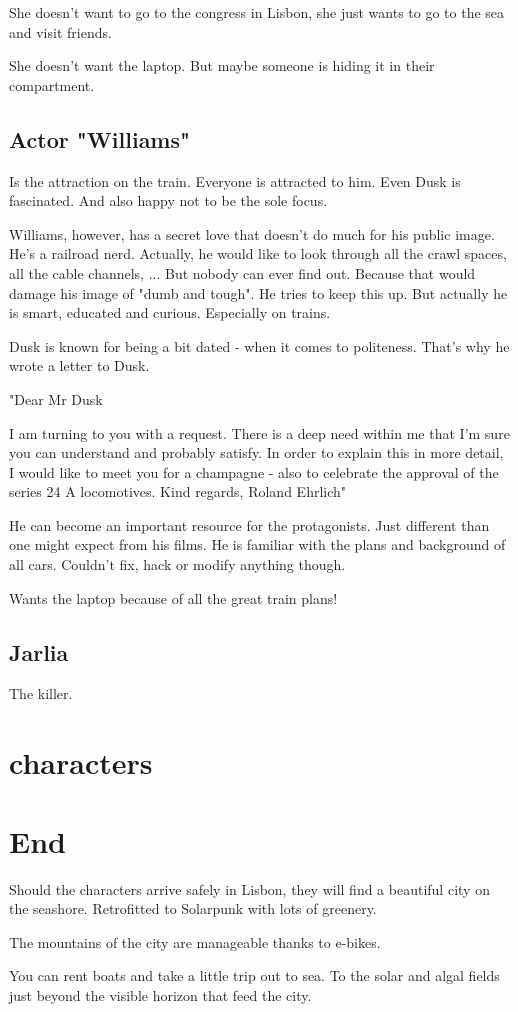 \documentclass{book}
\begin{document}
She doesn't want to go to the congress in Lisbon, she just wants to go to the sea and visit friends.

She doesn't want the laptop. But maybe someone is hiding it in their compartment.

\subsection{Actor "Williams"}


Is the attraction on the train. Everyone is attracted to him. Even Dusk is fascinated. And also happy not to be the sole focus.

Williams, however, has a secret love that doesn't do much for his public image. He's a railroad nerd. Actually, he would like to look through all the crawl spaces, all the cable channels, ...
But nobody can ever find out. Because that would damage his image of "dumb and tough". He tries to keep this up. But actually he is smart, educated and curious. Especially on trains.

Dusk is known for being a bit dated - when it comes to politeness. That's why he wrote a letter to Dusk.

"Dear Mr Dusk

I am turning to you with a request. There is a deep need within me that I'm sure you can understand and probably satisfy. In order to explain this in more detail, I would like to meet you for a champagne - also to celebrate the approval of the series 24 A locomotives. Kind regards, Roland Ehrlich"

He can become an important resource for the protagonists. Just different than one might expect from his films. He is familiar with the plans and background of all cars. Couldn't fix, hack or modify anything though.

Wants the laptop because of all the great train plans!

\subsection{Jarlia}


The killer.




\section{characters}



\section{End}


Should the characters arrive safely in Lisbon, they will find a beautiful city on the seashore. Retrofitted to Solarpunk with lots of greenery.

The mountains of the city are manageable thanks to e-bikes.

You can rent boats and take a little trip out to sea. To the solar and algal fields just beyond the visible horizon that feed the city.
\end{document}
